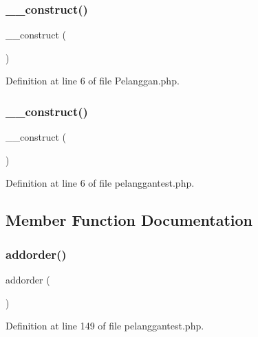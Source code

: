 \subsubsection{\texorpdfstring{\_\_construct()}{\_\_construct()}\hspace{0.1cm}{\footnotesize\ttfamily [1/2]}}
{\footnotesize\ttfamily \+\_\+\+\_\+construct (\begin{DoxyParamCaption}{ }\end{DoxyParamCaption})}



Definition at line 6 of file Pelanggan.\+php.

\mbox{\label{class_pelanggan_a095c5d389db211932136b53f25f39685}} 
\subsubsection{\texorpdfstring{\_\_construct()}{\_\_construct()}\hspace{0.1cm}{\footnotesize\ttfamily [2/2]}}
{\footnotesize\ttfamily \+\_\+\+\_\+construct (\begin{DoxyParamCaption}{ }\end{DoxyParamCaption})}



Definition at line 6 of file pelanggantest.\+php.



\subsection{Member Function Documentation}
\mbox{\label{class_pelanggan_a375fb206d13bec0bc37f55b825bcbebf}} 
\subsubsection{\texorpdfstring{addorder()}{addorder()}\hspace{0.1cm}{\footnotesize\ttfamily [1/2]}}
{\footnotesize\ttfamily addorder (\begin{DoxyParamCaption}{ }\end{DoxyParamCaption})}



Definition at line 149 of file pelanggantest.\+php.

